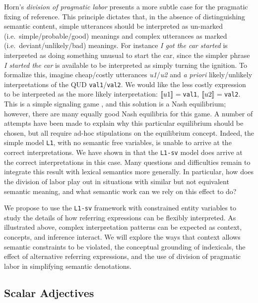 \documentclass[12pt]{article}
\newcommand{\llbracket}{\ensuremath{\left [\!\left [}}%
\newcommand{\rrbracket}{\ensuremath{\right ]\!\right ]}}
\providecommand{\sv}[1]{\ensuremath{\llbracket #1 \rrbracket}}
\begin{document}
Horn's \emph{division of pragmatic labor} \cite{Horn1984} presents a more subtle case for the pragmatic fixing of reference. This principle dictates that, in the absence of distinguishing semantic content, simple utterances should be interpreted as un-marked (i.e.~simple/probable/good) meanings and complex utterances as marked (i.e.~deviant/unlikely/bad) meanings. For instance \emph{I got the car started} is interpreted as doing something unusual to start the car, since the simpler phrase \emph{I started the car} is available to be interpreted as simply turning the ignition.
To formalize this, imagine cheap/costly utterances \emph{u1}/\emph{u2} and \emph{a priori} likely/unlikely interpretations of the QUD \lstinline{val1}/\lstinline[mathescape]{val2}.
We would like the less costly expression to be interpreted as the more likely interpretation: 
\sv{u1}${=}$\lstinline{val1}, \sv{u2}${=}$\lstinline{val2}. 
This is a simple signaling game \cite{Franke2009}, and this solution is a Nash equilibrium; however, there are many equally good Nash equilibria for this game. A number of attempts have been made to explain why this particular equilibrium should be chosen, but all require ad-hoc stipulations on the equilibrium concept.
Indeed, the simple model \lstinline{L1}, with no semantic free variables, is unable to arrive at the correct interpretations.
We have shown in \cite{bergen12} that the \lstinline{L1-sv} model does arrive at the correct interpretations in this case.
Many questions and difficulties remain to integrate this result with lexical semantics more generally. In particular, how does the division of labor play out in situations with similar but not equivalent semantic meaning, and what semantic work can we rely on this  effect to do?

We propose to use the \lstinline{L1-sv} framework with constrained entity variables to study the details of how referring expressions can be flexibly interpreted. 
As illustrated above, complex interpretation patterns can be expected as context, concepts, and inference interact.
We will explore the ways that context allows semantic constraints to be violated, the conceptual grounding of indexicals, the effect of alternative referring expressions, and the use of division of pragmatic labor in simplifying semantic denotations.


\subsection{Scalar Adjectives}
  \label{sec:GA}
  
\end{document}
